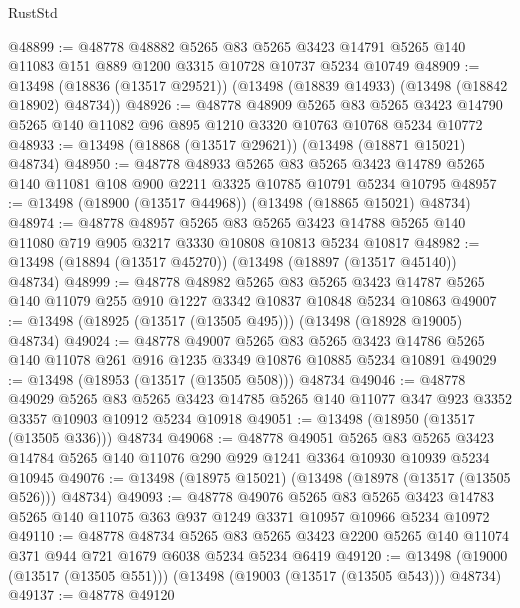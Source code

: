 \begin{lexlean}{RustStd}
\begin{coremodule}
@48899 := @48778
    @48882
    @5265
    @83
    @5265
    @3423
    @14791
    @5265
    @140
    @11083
    @151
    @889
    @1200
    @3315
    @10728
    @10737
    @5234
    @10749
@48909 := @13498 (@18836 (@13517 @29521)) (@13498 (@18839 @14933) (@13498 (@18842 @18902) @48734))
@48926 := @48778
    @48909
    @5265
    @83
    @5265
    @3423
    @14790
    @5265
    @140
    @11082
    @96
    @895
    @1210
    @3320
    @10763
    @10768
    @5234
    @10772
@48933 := @13498 (@18868 (@13517 @29621)) (@13498 (@18871 @15021) @48734)
@48950 := @48778
    @48933
    @5265
    @83
    @5265
    @3423
    @14789
    @5265
    @140
    @11081
    @108
    @900
    @2211
    @3325
    @10785
    @10791
    @5234
    @10795
@48957 := @13498 (@18900 (@13517 @44968)) (@13498 (@18865 @15021) @48734)
@48974 := @48778
    @48957
    @5265
    @83
    @5265
    @3423
    @14788
    @5265
    @140
    @11080
    @719
    @905
    @3217
    @3330
    @10808
    @10813
    @5234
    @10817
@48982 := @13498 (@18894 (@13517 @45270)) (@13498 (@18897 (@13517 @45140)) @48734)
@48999 := @48778
    @48982
    @5265
    @83
    @5265
    @3423
    @14787
    @5265
    @140
    @11079
    @255
    @910
    @1227
    @3342
    @10837
    @10848
    @5234
    @10863
@49007 := @13498 (@18925 (@13517 (@13505 @495))) (@13498 (@18928 @19005) @48734)
@49024 := @48778
    @49007
    @5265
    @83
    @5265
    @3423
    @14786
    @5265
    @140
    @11078
    @261
    @916
    @1235
    @3349
    @10876
    @10885
    @5234
    @10891
@49029 := @13498 (@18953 (@13517 (@13505 @508))) @48734
@49046 := @48778
    @49029
    @5265
    @83
    @5265
    @3423
    @14785
    @5265
    @140
    @11077
    @347
    @923
    @3352
    @3357
    @10903
    @10912
    @5234
    @10918
@49051 := @13498 (@18950 (@13517 (@13505 @336))) @48734
@49068 := @48778
    @49051
    @5265
    @83
    @5265
    @3423
    @14784
    @5265
    @140
    @11076
    @290
    @929
    @1241
    @3364
    @10930
    @10939
    @5234
    @10945
@49076 := @13498 (@18975 @15021) (@13498 (@18978 (@13517 (@13505 @526))) @48734)
@49093 := @48778
    @49076
    @5265
    @83
    @5265
    @3423
    @14783
    @5265
    @140
    @11075
    @363
    @937
    @1249
    @3371
    @10957
    @10966
    @5234
    @10972
@49110 := @48778
    @48734
    @5265
    @83
    @5265
    @3423
    @2200
    @5265
    @140
    @11074
    @371
    @944
    @721
    @1679
    @6038
    @5234
    @5234
    @6419
@49120 := @13498 (@19000 (@13517 (@13505 @551))) (@13498 (@19003 (@13517 (@13505 @543))) @48734)
@49137 := @48778
    @49120

\end{coremodule}
\end{lexlean}
